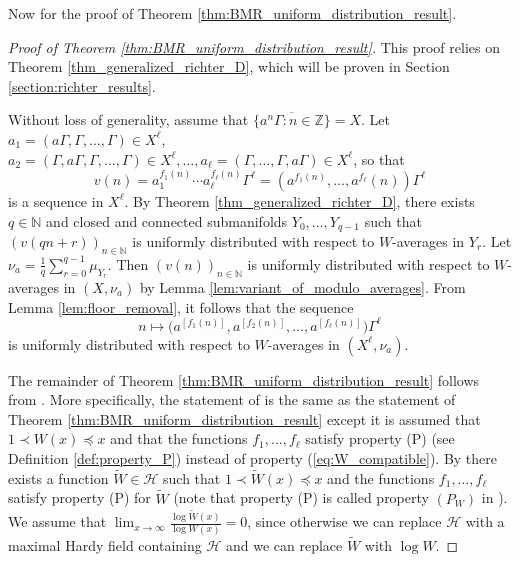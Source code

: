 \documentclass[12pt]{article}
\theoremstyle{plain} %
\theoremstyle{definition} %
\theoremstyle{plain}
\theoremstyle{plain}
\numberwithin{equation}{section}
\newcommand{\N}{\mathbb{N}}
\newcommand{\Z}{\mathbb{Z}}
\newcommand{\1}{\mathbbm{1}}
\newcommand{\oo}{\infty}
\newcommand{\round}[1]{[ #1 ]}
\begin{document}
Now for the proof of Theorem \ref{thm:BMR_uniform_distribution_result}.

\begin{proof}[Proof of Theorem \ref{thm:BMR_uniform_distribution_result}]
    This proof relies on Theorem \ref{thm_generalized_richter_D}, which will be proven in Section \ref{section:richter_results}.

    Without loss of generality, assume that $\overline{\{a^n\Gamma:n\in \Z\}} = X$. Let $a_1 = (a\Gamma,\Gamma,\dots,\Gamma)\in X^{\ell}$, $a_2 = (\Gamma,a\Gamma,\Gamma,\dots,\Gamma)\in X^{\ell}, \dots, a_{\ell} = (\Gamma,\dots,\Gamma,a\Gamma)\in X^{\ell}$, so that 
    \[
    v(n) = a_1^{f_1(n)}\cdots a_{\ell}^{f_{\ell}(n)} \Gamma^{\ell}= (a^{f_1(n)},\dots, a^{f_{\ell}}(n))\Gamma^{\ell}
    \]
    is a sequence in $X^{\ell}$. By Theorem \ref{thm_generalized_richter_D}, there exists $q\in \N$ and closed and connected submanifolds $Y_0,\dots,Y_{q-1}$ such that $(v(qn+r))_{n\in \N}$ is uniformly distributed with respect to $W$-averages in $Y_r$. Let $\nu_a = \frac{1}{q}\sum_{r=0}^{q-1}\mu_{Y_r}$. Then $(v(n))_{n\in \N}$ is uniformly distributed with respect to $W$-averages in $(X,
    \nu_a)$ by Lemma \ref{lem:variant_of_modulo_averages}. From Lemma \ref{lem:floor_removal}, it follows that the sequence
\begin{equation}\label{eq:BMR_5.2_again}
n \mapsto \bigl(a^{ \round{f_1(n)}},
a^{ \round{f_2(n)}},\ldots,
a^{ \round{f_{\ell}(n)}}\bigr)\Gamma^{\ell}
\end{equation}
is uniformly distributed with respect to $W$-averages in $(X^{\ell},\nu_a)$.


The remainder of Theorem \ref{thm:BMR_uniform_distribution_result} follows from \cite[Theorem 5.7]{BMR24}. More specifically, the statement of \cite[Theorem 5.7]{BMR24} is the same as the statement of Theorem \ref{thm:BMR_uniform_distribution_result} except it is assumed that $1\prec W(x)\preceq x$ and that the functions $f_1,\dots, f_{\ell}$ satisfy property (P) (see Definition \ref{def:property_P}) instead of property (\ref{eq:W_compatible}). By \cite[Corollary A.5]{Richter23} there exists a function $\widetilde{W}\in \mathcal{H}$ such that $1\prec \widetilde{W}(x)\preceq x$ and the functions $f_1,\dots, f_{\ell}$ satisfy property (P) for $\widetilde{W}$ (note that property (P) is called property $(P_W)$ in \cite{Richter23}). We assume that $\lim_{x\to\oo}\frac{\log \widetilde{W}(x)}{\log W(x)} = 0$, since otherwise we can replace $\mathcal{H}$ with a maximal Hardy field containing $\mathcal{H}$ and we can replace $\widetilde{W}$ with $\log {W}$. 



\end{proof}
\end{document}
